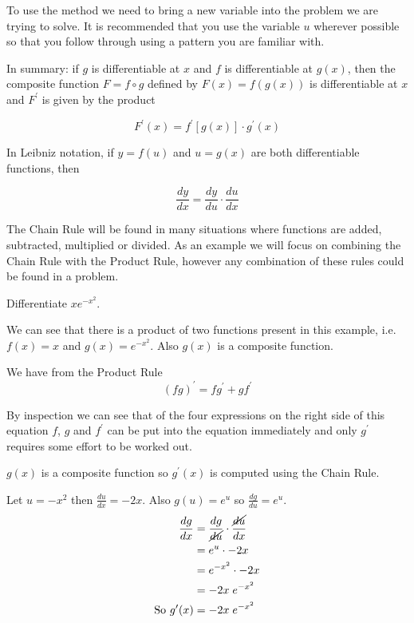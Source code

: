 To use the method we need to bring a new variable into the problem we are trying to solve. It
is recommended that you use the variable $u$ wherever possible so that you follow through using a pattern you are familiar with. 

In summary: if $g$ is differentiable at $x$ and $f$ is differentiable at $g (x)$, then the composite function $F =f \circ g$ defined by $F (x) =f (g (x))$ is differentiable at $x$ and $F^{ \prime }$ is given by the product
\begin{tcolorbox}
\[F^{ \prime } (x) =f^{ \prime } [g (x)] \cdot g^{ \prime } (x)\]
\end{tcolorbox}
In Leibniz notation, if $y =f (u)$ and $u =g (x)$ are both differentiable functions, then
\begin{tcolorbox}
\[\frac{d y}{d x} =\frac{d y}{d u} \cdot \frac{d u}{d x}\]
\end{tcolorbox}

The Chain Rule will be found in many situations where functions are added, subtracted, multiplied or divided. As an example we will focus on combining the Chain Rule with the Product Rule, however any combination of these rules could be found in a problem. 

\example Differentiate $\displaystyle xe^{-x^2}$. 

\solution We can see that there is a product of two functions present in this example, i.e. $f (x) =x$ and $g (x) =e^{ -x^{2}}$. Also $g (x)$ is a composite function. 

We have from the Product Rule
\begin{equation*}\left (f g\right )^{ \prime } =f g^{ \prime } +g f^{ \prime }
\end{equation*}

By inspection we can see that of the four expressions on the right side of this equation $f$, $g$ and $f^{ \prime }$ can be put into the equation immediately and only $g^{ \prime }$ requires some effort to be worked out. 

$g (x)$ is a composite function so $g^{ \prime } (x)$ is computed using the Chain Rule. 

Let $u = -x^{2}$ then $\frac{d u}{d x} = -2 x$. Also $g (u) =e^{u}$ so $\frac{d g}{d u} =e^{u}$.
\begin{align*}\frac{d g}{d x} &  = \frac{d g}{\cancel{d u}}\cdot \frac{\cancel{d u}}{d x} \\
 &  = e^{u} \cdot  -2 x \\
 &  = e^{ -x^{2}} \cdot  -2 x \\
 &  =  -2 x\; e^{ -x^{2}} \\
\text{So }g^{ \prime } (x) &  =  -2 x\; e^{ -x^{2}}\end{align*}

